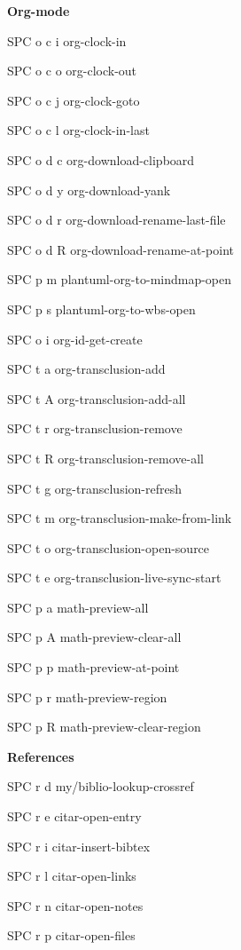 \documentclass[10pt]{article}
\renewcommand\subsection[1]{\smallskip\par\textbf{\color{heading}#1}}
\begin{document}
\begin{multicols}{4}
  \subsection{Org-mode}
  \begin{keylist}
    \item[SPC o c i] org-clock-in
    \item[SPC o c o] org-clock-out
    \item[SPC o c j] org-clock-goto
    \item[SPC o c l] org-clock-in-last
    \item[SPC o d c] org-download-clipboard
    \item[SPC o d y] org-download-yank
    \item[SPC o d r] org-download-rename-last-file
    \item[SPC o d R] org-download-rename-at-point
    \item[SPC p m] plantuml-org-to-mindmap-open
    \item[SPC p s] plantuml-org-to-wbs-open
    \item[SPC o i] org-id-get-create
    \item[SPC t a] org-transclusion-add
    \item[SPC t A] org-transclusion-add-all
    \item[SPC t r] org-transclusion-remove
    \item[SPC t R] org-transclusion-remove-all
    \item[SPC t g] org-transclusion-refresh
    \item[SPC t m] org-transclusion-make-from-link
    \item[SPC t o] org-transclusion-open-source
    \item[SPC t e] org-transclusion-live-sync-start
    \item[SPC p a] math-preview-all
    \item[SPC p A] math-preview-clear-all
    \item[SPC p p] math-preview-at-point
    \item[SPC p r] math-preview-region
    \item[SPC p R] math-preview-clear-region
  \end{keylist}

  \subsection{References}
  \begin{keylist}
    \item[SPC r d] my/biblio-lookup-crossref
    \item[SPC r e] citar-open-entry
    \item[SPC r i] citar-insert-bibtex
    \item[SPC r l] citar-open-links
    \item[SPC r n] citar-open-notes
    \item[SPC r p] citar-open-files
  \end{keylist}


\end{multicols}
\end{document}
